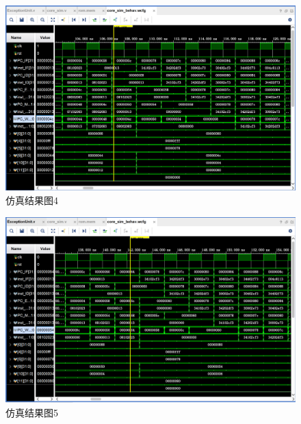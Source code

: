 \begin{figure}[H] %
	\centering %
	\includegraphics[width=1.0\textwidth]{figs/11.png} %
	\caption{仿真结果图4} %
	\label{Fig.14} %
\end{figure}
\begin{figure}[H] %
	\centering %
	\includegraphics[width=1.0\textwidth]{figs/12.png} %
	\caption{仿真结果图5} %
	\label{Fig.15} %
\end{figure}
